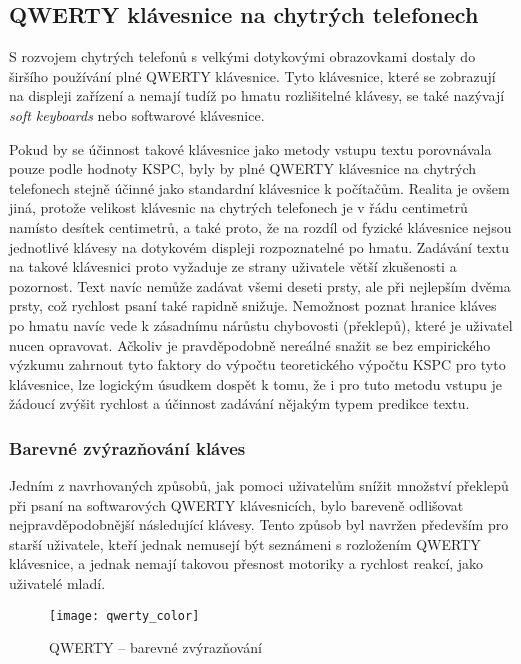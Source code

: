 \documentclass[a4paper,11pt]{article}
\begin{document}
\subsection{QWERTY klávesnice na chytrých telefonech}

S rozvojem chytrých telefonů s velkými dotykovými obrazovkami dostaly do širšího používání plné QWERTY klávesnice. Tyto klávesnice, které se zobrazují na displeji zařízení a nemají tudíž po hmatu rozlišitelné klávesy, se také nazývají {\it soft keyboards} nebo softwarové klávesnice.

Pokud by se účinnost takové klávesnice jako metody vstupu textu porovnávala pouze podle hodnoty KSPC, byly by plné QWERTY klávesnice na chytrých telefonech stejně účinné jako standardní klávesnice k počítačům. Realita je ovšem jiná, protože velikost klávesnic na chytrých telefonech je v řádu centimetrů namísto desítek centimetrů, a také proto, že na rozdíl od fyzické klávesnice nejsou jednotlivé klávesy na dotykovém displeji rozpoznatelné po hmatu. Zadávání textu na takové klávesnici proto vyžaduje ze strany uživatele větší zkušenosti a pozornost. Text navíc nemůže zadávat všemi deseti prsty, ale při nejlepším dvěma prsty, což rychlost psaní také rapidně snižuje. Nemožnost poznat hranice kláves po hmatu navíc vede k zásadnímu nárůstu chybovosti (překlepů), které je uživatel nucen opravovat. Ačkoliv je pravděpodobně nereálné snažit se bez empirického výzkumu zahrnout tyto faktory do výpočtu teoretického výpočtu KSPC pro tyto klávesnice, lze logickým úsudkem dospět k tomu, že i pro tuto metodu vstupu je žádoucí zvýšit rychlost a účinnost zadávání nějakým typem predikce textu.

\subsubsection{Barevné zvýrazňování kláves}

Jedním z navrhovaných způsobů, jak pomoci uživatelům snížit množství překlepů při psaní na softwarových QWERTY klávesnicích, bylo bareveně odlišovat nejpravděpodobnější následující klávesy. \parencite{danielgoncalves} %
Tento způsob byl navržen především pro starší uživatele, kteří jednak nemusejí být seznámeni s rozložením QWERTY klávesnice, a jednak nemají takovou přesnost motoriky a rychlost reakcí, jako uživatelé mladí. 

\begin{figure}[ht]
	\centering
	\texttt{[image: qwerty\_color]}
	\caption{QWERTY -- barevné zvýrazňování}
	\label{fig:qwerty-color}
\end{figure}
\end{document}
